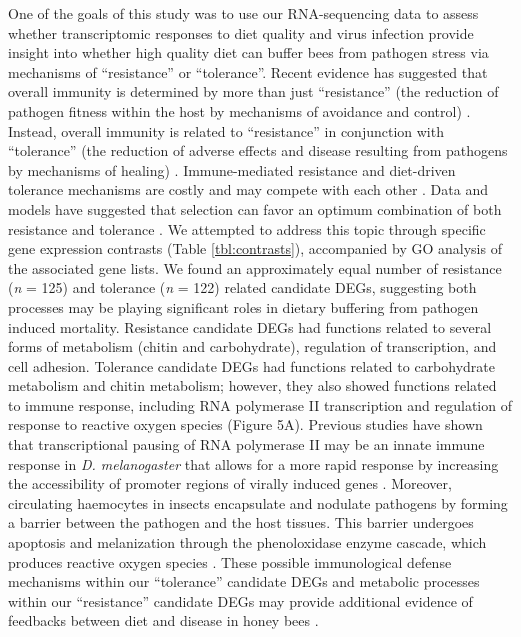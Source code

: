 \documentclass{bmcart}
\begin{document}
\begin{linenumbers}
\begin{doublespacing}
One of the goals of this study was to use our RNA-sequencing data to assess whether transcriptomic responses to diet quality and virus infection provide insight into whether high quality diet can buffer bees from pathogen stress via mechanisms of ``resistance'' or ``tolerance''. Recent evidence has suggested that overall immunity is determined by more than just ``resistance'' (the reduction of pathogen fitness within the host by mechanisms of avoidance and control) \cite{resTol2}. Instead, overall immunity is related to ``resistance'' in conjunction with ``tolerance'' (the reduction of adverse effects and disease resulting from pathogens by mechanisms of healing) \cite{resTol1, resTol2}. Immune-mediated resistance and diet-driven tolerance mechanisms are costly and may compete with each other \cite{resTol1, resTol4}. Data and models have suggested that selection can favor an optimum combination of both resistance and tolerance \cite{resTol5, resTol6, resTol7, resTol8}. We attempted to address this topic through specific gene expression contrasts (Table \ref{tbl:contrasts}), accompanied by GO analysis of the associated gene lists. We found an approximately equal number of resistance (\textit{n} = 125) and tolerance (\textit{n} = 122) related candidate DEGs, suggesting both processes may be playing significant roles in dietary buffering from pathogen induced mortality. Resistance candidate DEGs had functions related to several forms of metabolism (chitin and carbohydrate), regulation of transcription, and cell adhesion. Tolerance candidate DEGs had functions related to carbohydrate metabolism and chitin metabolism; however, they also showed functions related to immune response, including RNA polymerase II transcription and regulation of response to reactive oxygen species (Figure 5A). Previous studies have shown that transcriptional pausing of RNA polymerase II may be an innate immune response in \textit{D. melanogaster} that allows for a more rapid response by increasing the accessibility of promoter regions of virally induced genes \cite{resTol11}. Moreover, circulating haemocytes in insects encapsulate and nodulate pathogens by forming a barrier between the pathogen and the host tissues. This barrier undergoes apoptosis and melanization through the phenoloxidase enzyme cascade, which produces reactive oxygen species \cite{resTol1, resTol9, resTol10}. These possible immunological defense mechanisms within our ``tolerance'' candidate DEGs and metabolic processes within our ``resistance'' candidate DEGs may provide additional evidence of feedbacks between diet and disease in honey bees \cite{AdamTothReview}.


\end{doublespacing}
\end{linenumbers}
\end{document}
